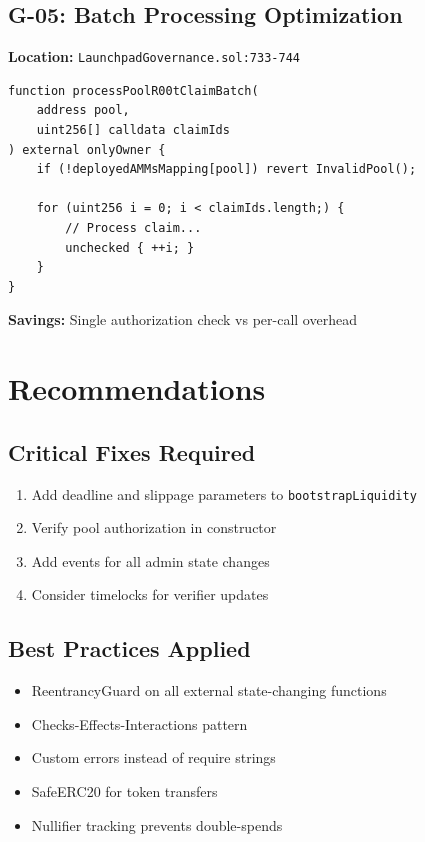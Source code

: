 \documentclass[11pt,a4paper]{article}
\begin{document}
\vspace{1em}

\begin{gasbox}
\subsection{G-05: Batch Processing Optimization}
\end{gasbox}

\textbf{Location:} \texttt{LaunchpadGovernance.sol:733-744}

\begin{lstlisting}
function processPoolR00tClaimBatch(
    address pool,
    uint256[] calldata claimIds
) external onlyOwner {
    if (!deployedAMMsMapping[pool]) revert InvalidPool();

    for (uint256 i = 0; i < claimIds.length;) {
        // Process claim...
        unchecked { ++i; }
    }
}
\end{lstlisting}

\textbf{Savings:} Single authorization check vs per-call overhead

\newpage

\section{Recommendations}

\subsection{Critical Fixes Required}

\begin{enumerate}
    \item Add deadline and slippage parameters to \texttt{bootstrapLiquidity}
    \item Verify pool authorization in constructor
    \item Add events for all admin state changes
    \item Consider timelocks for verifier updates
\end{enumerate}

\subsection{Best Practices Applied}

\begin{itemize}[label=\checkmark]
    \item ReentrancyGuard on all external state-changing functions
    \item Checks-Effects-Interactions pattern
    \item Custom errors instead of require strings
    \item SafeERC20 for token transfers
    \item Nullifier tracking prevents double-spends
\end{itemize}
\end{document}
